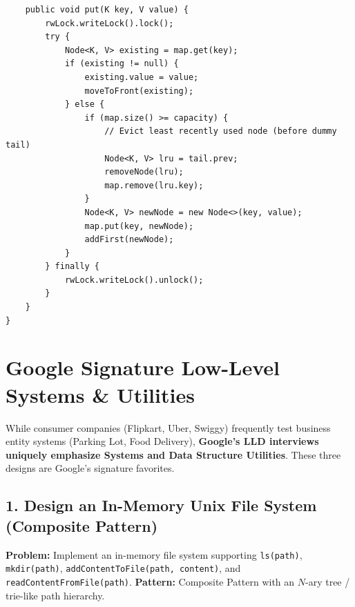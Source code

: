 \documentclass[10pt,journal,compsoc,onecolumn]{IEEEtran}
\begin{document}
\begin{verbatim}
    public void put(K key, V value) {
        rwLock.writeLock().lock();
        try {
            Node<K, V> existing = map.get(key);
            if (existing != null) {
                existing.value = value;
                moveToFront(existing);
            } else {
                if (map.size() >= capacity) {
                    // Evict least recently used node (before dummy tail)
                    Node<K, V> lru = tail.prev;
                    removeNode(lru);
                    map.remove(lru.key);
                }
                Node<K, V> newNode = new Node<>(key, value);
                map.put(key, newNode);
                addFirst(newNode);
            }
        } finally {
            rwLock.writeLock().unlock();
        }
    }
}
\end{verbatim}

\section{Google Signature Low-Level Systems \& Utilities}
\label{sec:google_lld}

While consumer companies (Flipkart, Uber, Swiggy) frequently test business entity systems (Parking Lot, Food Delivery), \textbf{Google's LLD interviews uniquely emphasize Systems and Data Structure Utilities}. These three designs are Google's signature favorites.

\subsection{1. Design an In-Memory Unix File System (Composite Pattern)}
\textbf{Problem:} Implement an in-memory file system supporting \texttt{ls(path)}, \texttt{mkdir(path)}, \texttt{addContentToFile(path, content)}, and \texttt{readContentFromFile(path)}.
\textbf{Pattern:} Composite Pattern with an $N$-ary tree / trie-like path hierarchy.
\end{document}
